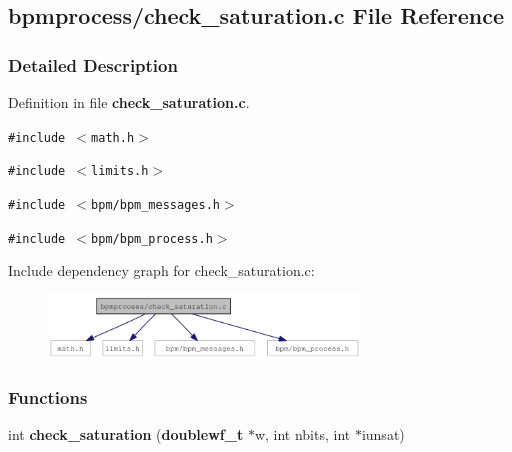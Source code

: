 \subsection{bpmprocess/check\_\-saturation.c File Reference}
\label{check__saturation_8c}


\subsubsection{Detailed Description}


Definition in file {\bf check\_\-saturation.c}.

{\tt \#include $<$math.h$>$}\par
{\tt \#include $<$limits.h$>$}\par
{\tt \#include $<$bpm/bpm\_\-messages.h$>$}\par
{\tt \#include $<$bpm/bpm\_\-process.h$>$}\par


Include dependency graph for check\_\-saturation.c:\nopagebreak
\begin{figure}[H]
\begin{center}
\leavevmode
\includegraphics[width=234pt]{check__saturation_8c__incl}
\end{center}
\end{figure}
\subsubsection*{Functions}
\begin{CompactItemize}
\item 
int {\bf check\_\-saturation} ({\bf doublewf\_\-t} $\ast$w, int nbits, int $\ast$iunsat)
\end{CompactItemize}
